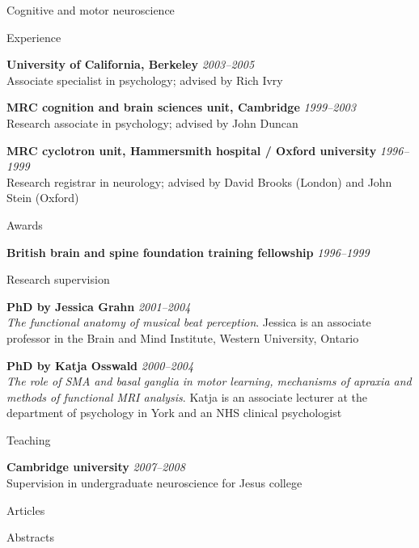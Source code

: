\documentclass{cv}
\newcommand{\PlaceDateNote}[3]{{\bf #1} \hfill {\em #2} \\#3}
\newcommand{\UCB}{University of California, Berkeley}
\newcommand{\CBU}{MRC cognition and brain sciences unit, Cambridge}
\begin{document}
\begin{cvSection}{Cognitive and motor neuroscience}

\begin{cvSubSection}{Experience}

\PlaceDateNote{\UCB}{2003--2005 }{
Associate specialist in psychology; advised by Rich Ivry}

\PlaceDateNote{\CBU}{1999--2003 }{
Research associate in psychology; advised by John Duncan}

{\bf MRC cyclotron unit, Hammersmith hospital / Oxford university}
\hfill {\em 1996--1999} \\
Research registrar in neurology; advised by David Brooks (London) and John
Stein (Oxford)

\end{cvSubSection}

\begin{cvSubSection}{Awards}

{\bf British brain and spine foundation training fellowship} \hfill {\em
1996--1999}

\end{cvSubSection}

\begin{cvSubSection}{Research supervision}

\PlaceDateNote{PhD by Jessica Grahn}{2001--2004}{
{\em The functional anatomy of musical beat perception}. Jessica is an
associate professor in the Brain and Mind Institute, Western University,
Ontario}

\PlaceDateNote{PhD by Katja Osswald}{2000--2004}{
{\em The role of SMA and basal ganglia in motor learning, mechanisms of
apraxia and methods of functional MRI analysis}. Katja is an associate
lecturer at the department of psychology in York and an NHS clinical
psychologist}

\end{cvSubSection}

\begin{cvSubSection}{Teaching}

\PlaceDateNote{Cambridge university}{2007--2008}{
Supervision in undergraduate neuroscience for Jesus college}

\end{cvSubSection}

\begin{cvSubSection}{Articles}

\printbibliography[heading=none,
    keyword=movethink,
    keyword=article,
notkeyword=omit]

\end{cvSubSection}

\begin{cvSubSection}{Abstracts}

\printbibliography[heading=none,
    keyword=movethink,
    keyword=abstract,
notkeyword=omit]

\end{cvSubSection}

\end{cvSection}
\end{document}
